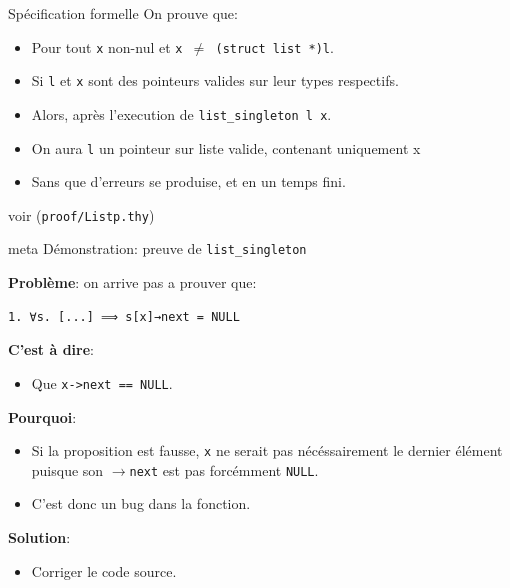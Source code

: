 \documentclass[hyperref={pdfpagelabels=false}]{beamer}
\begin{document}
\begin{frame}[fragile]{Spécification formelle}
  On prouve que:\\
  \begin{itemize}
    \item<2-> Pour tout \texttt{x} non-nul et \texttt{x $\neq$ (struct list *)l}.
    \item<3-> Si \texttt{l} et \texttt{x} sont des pointeurs valides sur leur types respectifs.
    \item<4-> Alors, après l'execution de \texttt{list\_singleton l x}.
    \item<5-> On aura \texttt{l} un pointeur sur liste valide, contenant uniquement x
    \item<6-> Sans que d'erreurs se produise, et en un temps fini.
  \end{itemize}

  \vfill
  \hfill
  {\tiny voir (\texttt{proof/Listp.thy})}
\end{frame}

\begin{frame}

  \begin{beamercolorbox}[sep=8pt,center,shadow=true,rounded=true]{meta}
    Démonstration: preuve de \texttt{list\_singleton}\par%
  \end{beamercolorbox}
\end{frame}

\begin{frame}[fragile]
  \textbf{Problème}: on arrive pas a prouver que:
  \begin{lstlisting}
1. ∀s. [...] ⟹ s[x]→next = NULL
  \end{lstlisting}
  \pause
  \textbf{C'est à dire}:
  \begin{itemize}
    \item Que \texttt{x->next == NULL}.
  \end{itemize}
  \pause
  \textbf{Pourquoi}:
  \begin{itemize}
    \item Si la proposition est fausse, \texttt{x} ne serait pas nécéssairement le dernier élément puisque son \texttt{$\rightarrow$next} est pas forcémment \texttt{NULL}.
    \item C'est donc un bug dans la fonction.
  \end{itemize}
  \pause
  \textbf{Solution}:
  \begin{itemize}
    \item Corriger le code source.
  \end{itemize}
\end{frame}
\end{document}

